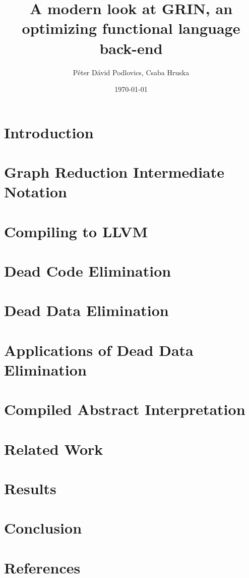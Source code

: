 \documentclass[10pt,a4paper,oneside]{article}
\title{A modern look at GRIN, an optimizing functional language back-end}
\date{\today}
\author{Péter Dávid Podlovics, Csaba Hruska}
\begin{document}
	
	
	
	\tableofcontents
	
	\section{Introduction} \label{sec-intro}
	
	
	\section{Graph Reduction Intermediate Notation}
	
	
	\section{Compiling to LLVM}
	
	
	\section{Dead Code Elimination}
	
	
	\section{Dead Data Elimination}
	
	
	\section{Applications of Dead Data Elimination}
	
	
	\section{Compiled Abstract Interpretation}
	
	\section{Related Work}
	
	\section{Results}
	\section{Conclusion}
	\section{References}
	
	

	
\end{document}

